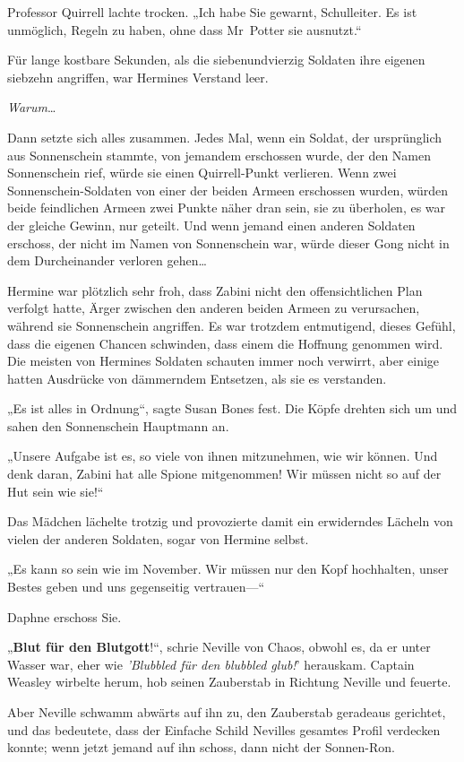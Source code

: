 {Professor Quirrell lachte trocken. „Ich habe Sie gewarnt, Schulleiter. Es ist unmöglich, Regeln zu haben, ohne dass Mr~Potter sie ausnutzt.“

Für lange kostbare Sekunden, als die siebenundvierzig Soldaten ihre eigenen siebzehn angriffen, war Hermines Verstand leer.

\emph{Warum}…

Dann setzte sich alles zusammen. Jedes Mal, wenn ein Soldat, der ursprünglich aus Sonnenschein stammte, von jemandem erschossen wurde, der den Namen Sonnenschein rief, würde sie einen Quirrell-Punkt verlieren. Wenn zwei Sonnenschein-Soldaten von einer der beiden Armeen erschossen wurden, würden beide feindlichen Armeen zwei Punkte näher dran sein, sie zu überholen, es war der gleiche Gewinn, nur geteilt. Und wenn jemand einen anderen Soldaten erschoss, der nicht im Namen von Sonnenschein war, würde dieser Gong nicht in dem Durcheinander verloren gehen…

Hermine war plötzlich sehr froh, dass Zabini nicht den offensichtlichen Plan verfolgt hatte, Ärger zwischen den anderen beiden Armeen zu verursachen, während sie Sonnenschein angriffen. Es war trotzdem entmutigend, dieses Gefühl, dass die eigenen Chancen schwinden, dass einem die Hoffnung genommen wird. Die meisten von Hermines Soldaten schauten immer noch verwirrt, aber einige hatten Ausdrücke von dämmerndem Entsetzen, als sie es verstanden.

„Es ist alles in Ordnung“, sagte Susan Bones fest. Die Köpfe drehten sich um und sahen den Sonnenschein Hauptmann an.

„Unsere Aufgabe ist es, so viele von ihnen mitzunehmen, wie wir können. Und denk daran, Zabini hat alle Spione mitgenommen! Wir müssen nicht so auf der Hut sein wie sie!“

Das Mädchen lächelte trotzig und provozierte damit ein erwiderndes Lächeln von vielen der anderen Soldaten, sogar von Hermine selbst.

„Es kann so sein wie im November. Wir müssen nur den Kopf hochhalten, unser Bestes geben und uns gegenseitig vertrauen—“

Daphne erschoss Sie.

„\textbf{Blut für den Blutgott}!“, schrie Neville von Chaos, obwohl es, da er unter Wasser war, eher wie \emph{'Blubbled für den blubbled glub!}' herauskam. Captain Weasley wirbelte herum, hob seinen Zauberstab in Richtung Neville und feuerte.

Aber Neville schwamm abwärts auf ihn zu, den Zauberstab geradeaus gerichtet, und das bedeutete, dass der Einfache Schild Nevilles gesamtes Profil verdecken konnte; wenn jetzt jemand auf ihn schoss, dann nicht der Sonnen-Ron.

}
